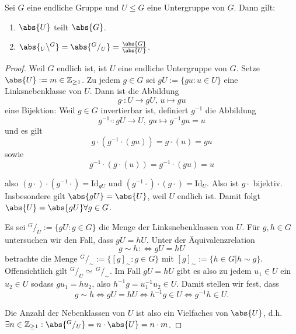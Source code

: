 \begin{satz}[Lagrange]
Sei $G$ eine endliche Gruppe und $U \leq G$ eine Untergruppe von $G$. Dann gilt:
\begin{enumerate}
\renewcommand{\labelenumi}{(\theenumi)}
\item $\abs{U}$ teilt $\abs{G}$.
\item $\abs{_U \backslash ^G} = \abs{^G/_U} = \frac{\abs{G}}{\abs{U}}$.
\end{enumerate}
\end{satz}
\begin{proof}
Weil $G$ endlich ist, ist $U$ eine endliche Untergruppe von $G$. Setze $\abs{U} := m \in \mathbb{Z}_{\geq1}$. Zu jedem $g \in G$ sei
$gU := \{ gu : u \in U \}$ eine Linksnebenklasse von $U$.
Dann ist die Abbildung
\[
g\cdot : U \rightarrow gU,\, u \mapsto gu
\]
eine Bijektion: Weil $g \in G$ invertierbar ist, definiert $g^{-1}$ die Abbildung
\[
g^{-1}\cdot : gU \rightarrow U,\, gu \mapsto g^{-1}gu = u
\]
und es gilt
\[
g\cdot ( g^{-1}\cdot( gu ) ) = g\cdot ( u ) = gu
\]
sowie
\[
g^{-1}\cdot( g\cdot( u ) ) = g^{-1}\cdot( gu ) = u
\]

also $(g\cdot)\cdot(g^{-1}\cdot) = \mathrm{Id}_{gU}$ und $(g^{-1}\cdot)\cdot(g\cdot) = \mathrm{Id}_{U}$.
Also ist $g\cdot$ bijektiv. Insbesondere gilt $\abs{gU} = \abs{U}$, weil $U$ endlich ist.
Damit folgt $\abs{U} = \abs{gU} \forall g \in G$. 

Es sei $^G/_U := \{ gU : g \in G \}$ die Menge der Linksnebenklassen von $U$.
Für $g, h \in G$ untersuchen wir den Fall, dass $gU = hU$.
Unter der Äquivalenzrelation
\[
g \sim h :\Leftrightarrow gU = hU
\]
betrachte die Menge $^G/_\sim := \{ [g]_\sim : g \in G \}$ mit $[g]_\sim := \{ h \in G | h \sim g \}$. Offensichtlich gilt $^G/_U \simeq \,^G/_\sim$.
Im Fall $gU = hU$ gibt es also zu jedem $u_{1} \in U$ ein $u_{2} \in U$ sodass $gu_{1} = hu_{2}$, also $h^{-1}g = u_{1}^{-1}u_{2} \in U$. Damit
stellen wir fest, dass
\[
g \sim h \Leftrightarrow gU = hU \Leftrightarrow h^{-1}g \in U \Leftrightarrow g^{-1}h \in U.
\]


Die Anzahl der Nebenklassen von $U$ ist also ein Vielfaches von $\abs{U}$, d.h. $\exists n \in \mathbb{Z}_{\geq1} : \abs{^G/_U} = n\cdot \abs{U} = n\cdot m$.

\end{proof}
